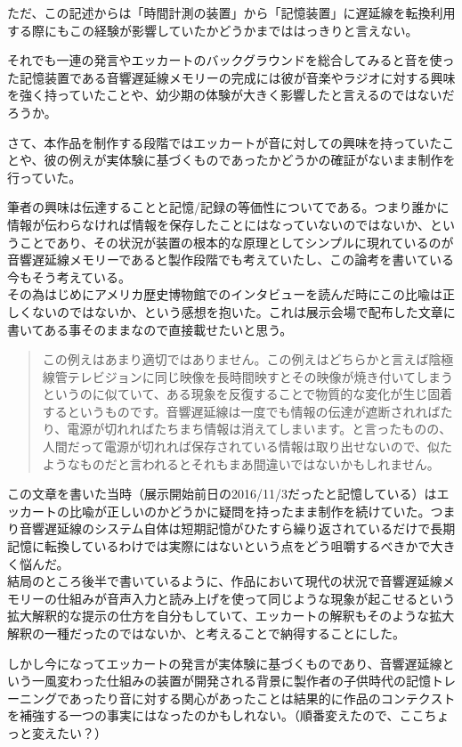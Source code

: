 \documentclass[a4paper,report]{jsbook}
\begin{document}
ただ、この記述からは「時間計測の装置」から「記憶装置」に遅延線を転換利用する際にもこの経験が影響していたかどうかまでははっきりと言えない。

それでも一連の発言やエッカートのバックグラウンドを総合してみると音を使った記憶装置である音響遅延線メモリーの完成には彼が音楽やラジオに対する興味を強く持っていたことや、幼少期の体験が大きく影響したと言えるのではないだろうか。

さて、本作品を制作する段階ではエッカートが音に対しての興味を持っていたことや、彼の例えが実体験に基づくものであったかどうかの確証がないまま制作を行っていた。

筆者の興味は伝達することと記憶/記録の等価性についてである。つまり誰かに情報が伝わらなければ情報を保存したことにはなっていないのではないか、ということであり、その状況が装置の根本的な原理としてシンプルに現れているのが音響遅延線メモリーであると製作段階でも考えていたし、この論考を書いている今もそう考えている。\\
その為はじめにアメリカ歴史博物館でのインタビューを読んだ時にこの比喩は正しくないのではないか、という感想を抱いた。これは展示会場で配布した文章に書いてある事そのままなので直接載せたいと思う。

\begin{quote}
この例えはあまり適切ではありません。この例えはどちらかと言えば陰極線管テレビジョンに同じ映像を長時間映すとその映像が焼き付いてしまうというのに似ていて、ある現象を反復することで物質的な変化が生じ固着するというものです。音響遅延線は一度でも情報の伝達が遮断されればたり、電源が切れればたちまち情報は消えてしまいます。と言ったものの、人間だって電源が切れれば保存されている情報は取り出せないので、似たようなものだと言われるとそれもまあ間違いではないかもしれません。
\end{quote}

この文章を書いた当時（展示開始前日の2016/11/3だったと記憶している）はエッカートの比喩が正しいのかどうかに疑問を持ったまま制作を続けていた。つまり音響遅延線のシステム自体は短期記憶がひたすら繰り返されているだけで長期記憶に転換しているわけでは実際にはないという点をどう咀嚼するべきかで大きく悩んだ。\\
結局のところ後半で書いているように、作品において現代の状況で音響遅延線メモリーの仕組みが音声入力と読み上げを使って同じような現象が起こせるという拡大解釈的な提示の仕方を自分もしていて、エッカートの解釈もそのような拡大解釈の一種だったのではないか、と考えることで納得することにした。

しかし今になってエッカートの発言が実体験に基づくものであり、音響遅延線という一風変わった仕組みの装置が開発される背景に製作者の子供時代の記憶トレーニングであったり音に対する関心があったことは結果的に作品のコンテクストを補強する一つの事実にはなったのかもしれない。（順番変えたので、ここちょっと変えたい？）
\end{document}
